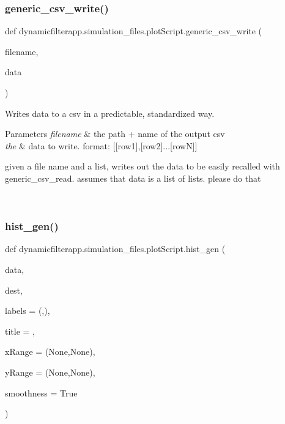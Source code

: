 \subsubsection{\texorpdfstring{generic\+\_\+csv\+\_\+write()}{generic\_csv\_write()}}
{\footnotesize\ttfamily def dynamicfilterapp.\+simulation\+\_\+files.\+plot\+Script.\+generic\+\_\+csv\+\_\+write (\begin{DoxyParamCaption}\item[{}]{filename,  }\item[{}]{data }\end{DoxyParamCaption})}



Writes data to a csv in a predictable, standardized way. 


\begin{DoxyParams}{Parameters}
{\em filename} & the path + name of the output csv \\
\hline
{\em the} & data to write. format\+: \mbox{[}\mbox{[}row1\mbox{]},\mbox{[}row2\mbox{]}...\mbox{[}rowN\mbox{]}\mbox{]} \begin{DoxyVerb}given a file name and a list, writes out the data to be easily recalled with
generic_csv_read. assumes that data is a list of lists. please do that
\end{DoxyVerb}
 \\
\hline
\end{DoxyParams}
\mbox{\label{namespacedynamicfilterapp_1_1simulation__files_1_1plot_script_adc58c0bae220ebecc2001221654f8b50}} 
\subsubsection{\texorpdfstring{hist\+\_\+gen()}{hist\_gen()}}
{\footnotesize\ttfamily def dynamicfilterapp.\+simulation\+\_\+files.\+plot\+Script.\+hist\+\_\+gen (\begin{DoxyParamCaption}\item[{}]{data,  }\item[{}]{dest,  }\item[{}]{labels = {\ttfamily (\textquotesingle{}\textquotesingle{},\textquotesingle{}\textquotesingle{})},  }\item[{}]{title = {\ttfamily \textquotesingle{}\textquotesingle{}},  }\item[{}]{x\+Range = {\ttfamily (None,None)},  }\item[{}]{y\+Range = {\ttfamily (None,None)},  }\item[{}]{smoothness = {\ttfamily True} }\end{DoxyParamCaption})}



